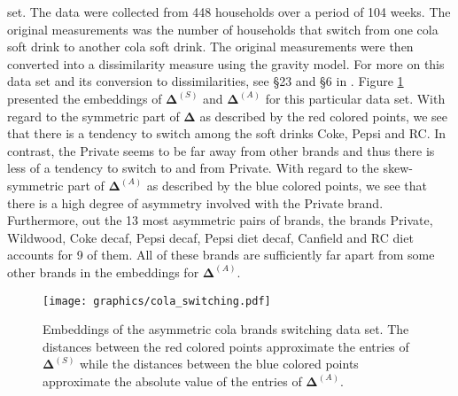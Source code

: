 \documentclass[11pt]{asaproc}
\begin{document}
set. The data were collected from 448 households over a period of 104
weeks. The original measurements was the number of households that
switch from one cola soft drink to another cola soft drink. The
original measurements were then converted into a dissimilarity measure
using the gravity model. For more on this data set and its conversion
to dissimilarities, see \S 23 and \S 6 in
\citet{borg05:_moder}. Figure \ref{fig:colaswitch} presented the
embeddings of $\bm{\Delta}^{(S)}$ and $\bm{\Delta}^{(A)}$ for this
particular data set. With regard to the symmetric part of
$\bm{\Delta}$ as described by the red colored points, we see that
there is a tendency to switch among the soft drinks Coke, Pepsi and
RC. In contrast, the Private seems to be far away from other brands
and thus there is less of a tendency to switch to and from
Private. With regard to the skew-symmetric part of $\bm{\Delta}^{(A)}$
as described by the blue colored points, we see that there is a high
degree of asymmetry involved with the Private brand. Furthermore, out
the 13 most asymmetric pairs of brands, the brands Private, Wildwood,
Coke decaf, Pepsi decaf, Pepsi diet decaf, Canfield and RC diet
accounts for 9 of them. All of these brands are sufficiently far apart
from some other brands in the embeddings for $\bm{\Delta}^{(A)}$. 
\begin{figure}[htbp]
  \centering
    \texttt{[image: graphics/cola\_switching.pdf]}
    \caption{Embeddings of the asymmetric cola brands switching
      data set. The distances between the red colored points
      approximate the entries of $\bm{\Delta}^{(S)}$ while the
      distances between the blue colored points approximate the
      absolute value of the entries of $\bm{\Delta}^{(A)}$.}
  \label{fig:colaswitch}
\end{figure}
\end{document}
